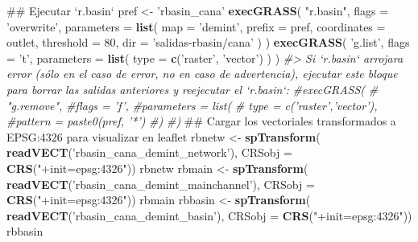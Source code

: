 \documentclass[11pt,]{article}
\newenvironment{Shaded}{\begin{snugshade}}{\end{snugshade}}
\newcommand{\KeywordTok}[1]{\textcolor[rgb]{0.13,0.29,0.53}{\textbf{#1}}}
\newcommand{\DataTypeTok}[1]{\textcolor[rgb]{0.13,0.29,0.53}{#1}}
\newcommand{\DecValTok}[1]{\textcolor[rgb]{0.00,0.00,0.81}{#1}}
\newcommand{\StringTok}[1]{\textcolor[rgb]{0.31,0.60,0.02}{#1}}
\newcommand{\CommentTok}[1]{\textcolor[rgb]{0.56,0.35,0.01}{\textit{#1}}}
\newcommand{\NormalTok}[1]{#1}
\begin{document}
\begin{Shaded}
\begin{Highlighting}[]
\NormalTok{## Ejecutar `r.basin`}
\NormalTok{pref <-}\StringTok{ 'rbasin_cana'}
\KeywordTok{execGRASS}\NormalTok{(}
  \StringTok{"r.basin"}\NormalTok{,}
  \DataTypeTok{flags =} \StringTok{'overwrite'}\NormalTok{,}
  \DataTypeTok{parameters =} \KeywordTok{list}\NormalTok{(}
    \DataTypeTok{map =} \StringTok{'demint'}\NormalTok{,}
    \DataTypeTok{prefix =}\NormalTok{ pref,}
    \DataTypeTok{coordinates =}\NormalTok{ outlet,}
    \DataTypeTok{threshold =} \DecValTok{80}\NormalTok{,}
    \DataTypeTok{dir =} \StringTok{'salidas-rbasin/cana'}
\NormalTok{  )}
\NormalTok{)}
\KeywordTok{execGRASS}\NormalTok{(}
  \StringTok{'g.list'}\NormalTok{,}
  \DataTypeTok{flags =} \StringTok{'t'}\NormalTok{,}
  \DataTypeTok{parameters =} \KeywordTok{list}\NormalTok{(}
    \DataTypeTok{type =} \KeywordTok{c}\NormalTok{(}\StringTok{'raster'}\NormalTok{, }\StringTok{'vector'}\NormalTok{)}
\NormalTok{  )}
\NormalTok{)}
\CommentTok{#> Si `r.basin` arrojara error (sólo en el caso de error, no en caso de advertencia), ejecutar este bloque para borrar las salidas anteriores y reejecutar el `r.basin`:}
\CommentTok{#execGRASS(}
 \CommentTok{# "g.remove",}
  \CommentTok{#flags = 'f',}
  \CommentTok{#parameters = list(}
   \CommentTok{# type = c('raster','vector'),}
    \CommentTok{#pattern = paste0(pref, '*')}
  \CommentTok{#)}
\CommentTok{#)}
\NormalTok{## Cargar los vectoriales transformados a EPSG:4326 para visualizar en leaflet}
\NormalTok{rbnetw <-}\StringTok{ }\KeywordTok{spTransform}\NormalTok{(}
  \KeywordTok{readVECT}\NormalTok{(}\StringTok{'rbasin_cana_demint_network'}\NormalTok{),}
  \DataTypeTok{CRSobj =} \KeywordTok{CRS}\NormalTok{(}\StringTok{"+init=epsg:4326"}\NormalTok{))}
\NormalTok{rbnetw}
\NormalTok{rbmain <-}\StringTok{ }\KeywordTok{spTransform}\NormalTok{(}
  \KeywordTok{readVECT}\NormalTok{(}\StringTok{'rbasin_cana_demint_mainchannel'}\NormalTok{),}
  \DataTypeTok{CRSobj =} \KeywordTok{CRS}\NormalTok{(}\StringTok{"+init=epsg:4326"}\NormalTok{))}
\NormalTok{rbmain}
\NormalTok{rbbasin <-}\StringTok{ }\KeywordTok{spTransform}\NormalTok{(}
  \KeywordTok{readVECT}\NormalTok{(}\StringTok{'rbasin_cana_demint_basin'}\NormalTok{),}
  \DataTypeTok{CRSobj =} \KeywordTok{CRS}\NormalTok{(}\StringTok{"+init=epsg:4326"}\NormalTok{))}
\NormalTok{rbbasin}


\end{Highlighting}
\end{Shaded}
\end{document}
